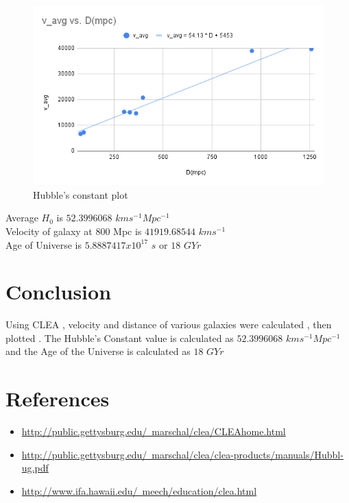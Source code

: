 \documentclass[letterpaper,11pt]{report}
\begin{document}
\begin{center}
    \begin{figure}[H]
        \centering
        \includegraphics[scale = 0.7]{v_avg vs. D(mpc).png}
        \caption{Hubble's constant plot}
        \label{fig:my_label}
    \end{figure}
\end{center}

\begin{center}
    Average $H_0$ is $52.3996068$ $km s^{-1} Mpc^{-1}$ \\
    Velocity of galaxy at 800 Mpc is $41919.68544$ $km s^{-1}$ \\
    Age of Universe is $5.8887417x10^{17}$ $s$ or $18$ $GYr$
\end{center}

\section{Conclusion}
Using CLEA , velocity and distance of various galaxies were calculated , then plotted . The Hubble's Constant value is calculated as $52.3996068$ $km s^{-1} Mpc^{-1}$ and the Age of the Universe is calculated as $18$ $GYr$

\section{References}
\begin{itemize}
    \item \href{http://public.gettysburg.edu/~marschal/clea/CLEAhome.html}{http://public.gettysburg.edu/~marschal/clea/CLEAhome.html}
    \item \href{http://public.gettysburg.edu/~marschal/clea/clea-products/manuals/Hubbl-ug.pdf}{http://public.gettysburg.edu/~marschal/clea/clea-products/manuals/Hubbl-ug.pdf}
    \item \href{http://www.ifa.hawaii.edu/~meech/education/clea.html}{http://www.ifa.hawaii.edu/~meech/education/clea.html}
\end{itemize}
\end{document}
